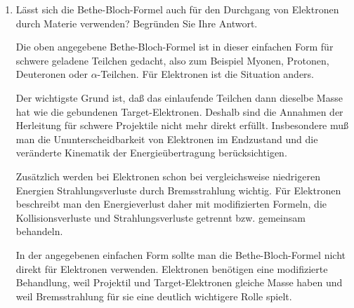 \documentclass[11pt,a4paper]{scrartcl}
\begin{document}
\begin{enumerate}[label=(\alph*)]
            \begin{answerbox}
                Die Kurve fällt bei kleinen Energien stark ab, erreicht ein Minimum und steigt
                bei hohen Energien nur langsam logarithmisch wieder an. Die in Teil (a)
                berechneten Werte legen die Größenordnung für Proton, Deuteron und
                $\alpha$-Teilchen bei $\SI{1}{GeV}$ fest.
            \end{answerbox}

        \item
            Lässt sich die Bethe-Bloch-Formel auch für den Durchgang von Elektronen durch
            Materie verwenden? Begründen Sie Ihre Antwort.

            \begin{calculationbox}
                Die oben angegebene Bethe-Bloch-Formel ist in dieser einfachen Form für schwere
                geladene Teilchen gedacht, also zum Beispiel Myonen, Protonen, Deuteronen oder
                $\alpha$-Teilchen. Für Elektronen ist die Situation anders.

                \begin{calculationbox}
                    Der wichtigste Grund ist, daß das einlaufende Teilchen dann dieselbe Masse
                    hat wie die gebundenen Target-Elektronen. Deshalb sind die Annahmen der
                    Herleitung für schwere Projektile nicht mehr direkt erfüllt. Insbesondere
                    muß man die Ununterscheidbarkeit von Elektronen im Endzustand und die
                    veränderte Kinematik der Energieübertragung berücksichtigen.
                \end{calculationbox}

                \begin{calculationbox}
                    Zusätzlich werden bei Elektronen schon bei vergleichsweise niedrigeren
                    Energien Strahlungsverluste durch Bremsstrahlung wichtig. Für Elektronen
                    beschreibt man den Energieverlust daher mit modifizierten Formeln, die
                    Kollisionsverluste und Strahlungsverluste getrennt bzw. gemeinsam behandeln.
                \end{calculationbox}
            \end{calculationbox}

            \begin{answerbox}
                In der angegebenen einfachen Form sollte man die Bethe-Bloch-Formel nicht direkt
                für Elektronen verwenden. Elektronen benötigen eine modifizierte Behandlung,
                weil Projektil und Target-Elektronen gleiche Masse haben und weil Bremsstrahlung
                für sie eine deutlich wichtigere Rolle spielt.
            \end{answerbox}
    \end{enumerate}
\end{document}
